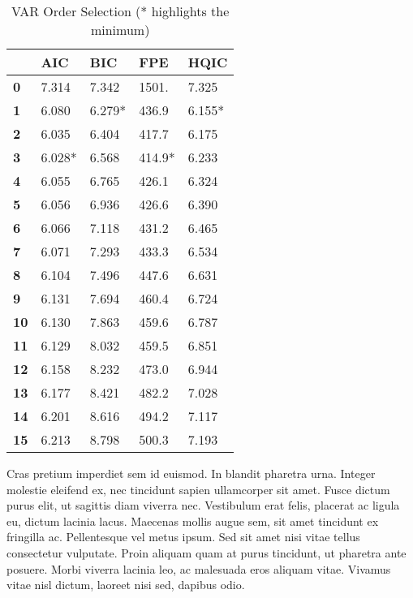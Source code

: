 \documentclass{article}
\begin{document}
\begin{table}[ht]
    \centering
    \begin{tabular}{lllll}
      \toprule
        ~ & \textbf{AIC} & \textbf{BIC} & \textbf{FPE} & \textbf{HQIC} \\ \midrule
        \textbf{0} & 7.314 & 7.342 & 1501. & 7.325 \\ 
        \textbf{1} & 6.080 & 6.279* & 436.9 & 6.155* \\ 
        \textbf{2} & 6.035 & 6.404 & 417.7 & 6.175 \\ 
        \textbf{3} & 6.028* & 6.568 & 414.9* & 6.233 \\ 
        \textbf{4} & 6.055 & 6.765 & 426.1 & 6.324 \\ 
        \textbf{5} & 6.056 & 6.936 & 426.6 & 6.390 \\ 
        \textbf{6} & 6.066 & 7.118 & 431.2 & 6.465 \\ 
        \textbf{7} & 6.071 & 7.293 & 433.3 & 6.534 \\ 
        \textbf{8} & 6.104 & 7.496 & 447.6 & 6.631 \\ 
        \textbf{9} & 6.131 & 7.694 & 460.4 & 6.724 \\ 
        \textbf{10} & 6.130 & 7.863 & 459.6 & 6.787 \\ 
        \textbf{11} & 6.129 & 8.032 & 459.5 & 6.851 \\ 
        \textbf{12} & 6.158 & 8.232 & 473.0 & 6.944 \\ 
        \textbf{13} & 6.177 & 8.421 & 482.2 & 7.028 \\ 
        \textbf{14} & 6.201 & 8.616 & 494.2 & 7.117 \\ 
        \textbf{15} & 6.213 & 8.798 & 500.3 & 7.193 \\ \bottomrule
    \end{tabular}
    \caption{VAR Order Selection (* highlights the minimum)}
    \label{VAROrderSelection}
\end{table}

Cras pretium imperdiet sem id euismod. In blandit pharetra urna. Integer
molestie eleifend ex, nec tincidunt sapien ullamcorper sit amet. Fusce
dictum purus elit, ut sagittis diam viverra nec. Vestibulum erat felis,
placerat ac ligula eu, dictum lacinia lacus. Maecenas mollis augue sem,
sit amet tincidunt ex fringilla ac. Pellentesque vel metus ipsum. Sed
sit amet nisi vitae tellus consectetur vulputate. Proin aliquam quam at
purus tincidunt, ut pharetra ante posuere. Morbi viverra lacinia leo, ac
malesuada eros aliquam vitae. Vivamus vitae nisl dictum, laoreet nisi
sed, dapibus odio.
\end{document}
